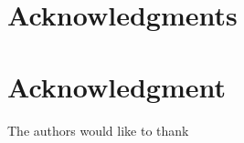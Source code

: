 \documentclass[10pt,journal,compsoc]{IEEEtran}
\begin{document}
\ifCLASSOPTIONcompsoc
  \section*{Acknowledgments}
\else
  \section*{Acknowledgment}
\fi


The authors would like to thank


\ifCLASSOPTIONcaptionsoff
  \newpage
\fi



\end{document}
